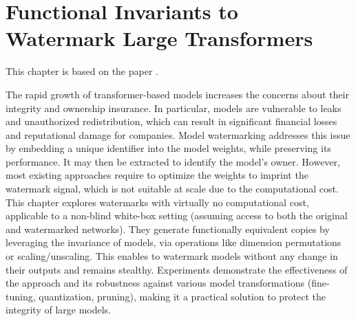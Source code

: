
\chapter{Functional Invariants to Watermark Large Transformers}\label{chapter:invariants}

This chapter is based on the paper .

The rapid growth of transformer-based models increases the concerns about their integrity and ownership insurance. 
In particular, models are vulnerable to leaks and unauthorized redistribution, which can result in significant financial losses and reputational damage for companies. 
Model watermarking addresses this issue by embedding a unique identifier into the model weights, while preserving its performance. 
It may then be extracted to identify the model's owner.
However, most existing approaches require to optimize the weights to imprint the watermark signal, which is not suitable at scale due to the computational cost.
This chapter explores watermarks with virtually no computational cost, applicable to a non-blind white-box setting (assuming access to both the original and watermarked networks). 
They generate functionally equivalent copies by leveraging the invariance of models, via operations like dimension permutations or scaling/unscaling. 
This enables to watermark models without any change in their outputs and remains stealthy.
Experiments demonstrate the effectiveness of the approach  and its robustness against various model transformations (fine-tuning, quantization, pruning), making it a practical solution to protect the integrity of large models.

\newpage





